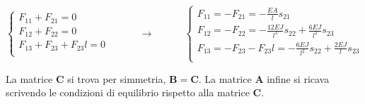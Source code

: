 \begin{equation*}
    \begin{cases}
        F_{11} + F_{21} =0\\
        F_{12} + F_{22} =0\\
        F_{13} + F_{23} +F_{23}l =0\\
    \end{cases}
    \quad\quad\quad\rightarrow\quad\quad\quad
    \begin{cases}
        F_{11}   =-F_{21}=   -\frac{EA}{l}s_{21}\\
        F_{12}   =-F_{22}= -   \frac{12EJ}{l^3} s_{22}  +   \frac{6EJ}{l^2} s_{23}\\
        F_{13}  =- F_{23} -F_{23}l= -   \frac{6EJ}{l^2} s_{22}  +   \frac{2EJ}{l} s_{23} \\
    \end{cases}
\end{equation*}

La matrice $\boldsymbol{C}$ si trova per simmetria, $\boldsymbol{B} =\boldsymbol{C} $. La matrice $\boldsymbol{A}$ infine si ricava scrivendo le condizioni di equilibrio rispetto alla matrice $\boldsymbol{C}$.





